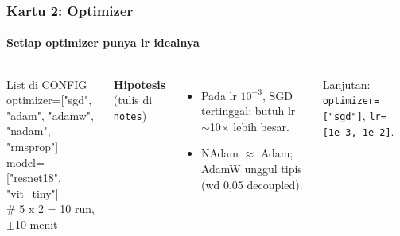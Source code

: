\documentclass[t,aspectratio=169,xcolor={dvipsnames,table}]{beamer}
\begin{document}
\begin{frame}
    \frametitle{Kartu 2: Optimizer}
    \framesubtitle{Setiap optimizer punya lr idealnya}
    \footnotesize

    \begin{columns}[T]
        \begin{block}{List di CONFIG}
            {\ttfamily\scriptsize optimizer=["sgd", "adam", "adamw",\\\hspace*{5.6em}"nadam", "rmsprop"]\\model=["resnet18", "vit\_tiny"]\\\# 5 x 2 = 10 run, $\pm$10 menit}
        \end{block}
        \textbf{Hipotesis} (tulis di \texttt{notes})
        \begin{itemize}
            \item Pada lr $10^{-3}$, SGD tertinggal: butuh lr $\sim$10$\times$ lebih besar.
            \item NAdam $\approx$ Adam; AdamW unggul tipis (wd 0,05 decoupled).
        \end{itemize}
        {\scriptsize Lanjutan: \texttt{optimizer=["sgd"]}, \texttt{lr=[1e-3, 1e-2]}.}


\end{columns}
\end{frame}
\end{document}
